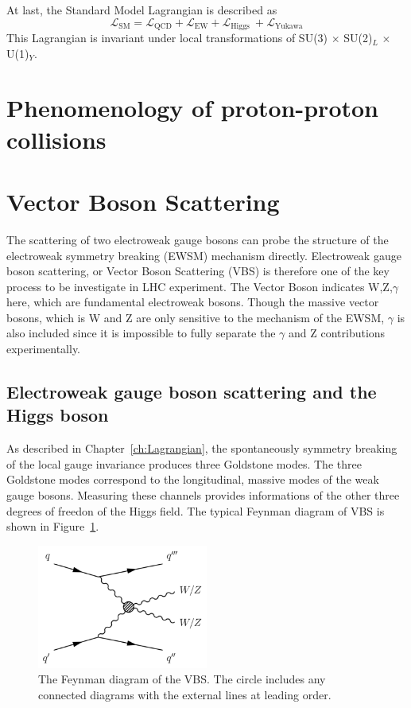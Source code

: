 At last, the Standard Model Lagrangian is described as 
\begin{equation}
\mathcal{L}_{\mathrm{SM}}=\mathcal{L}_{\mathrm{QCD}}+\mathcal{L}_{\mathrm{EW}}+\mathcal{L}_{\text {Higgs }}+\mathcal{L}_{\text {Yukawa}}
\end{equation}
This Lagrangian is invariant under local transformations of SU(3) $\times$ SU(2)$_L$ $\times$ U(1)$_Y$. 

\section{Phenomenology of proton-proton collisions}

\section{Vector Boson Scattering}
The scattering of two electroweak gauge bosons can probe the structure of the electroweak symmetry breaking (EWSM) mechanism directly. 
Electroweak gauge boson scattering, or Vector Boson Scattering (VBS) is therefore one of the key process to be investigate in LHC experiment.
The Vector Boson indicates W,Z,$\gamma$ here, which are fundamental electroweak bosons. Though the massive vector bosons, which is W and Z are only sensitive to the mechanism of the  EWSM, $\gamma$ is also included since it is impossible to fully separate the $\gamma$ and Z contributions experimentally. 
\subsection{Electroweak gauge boson scattering and the Higgs boson}
As described in Chapter~\ref{ch:Lagrangian}, the spontaneously symmetry breaking of the local gauge invariance produces three Goldstone modes. The three Goldstone modes correspond to the longitudinal, massive modes of the weak gauge bosons. Measuring these channels provides informations of the other three degrees of freedon of the Higgs field. The typical Feynman diagram of VBS is shown in Figure~\ref{fig:VBS}.

\begin{figure}[tbp]
\begin{center}
 \includegraphics[width=0.50\textwidth,keepaspectratio]{figures/VBS}
\caption{
The Feynman diagram of the VBS. The circle includes any connected diagrams with the external lines at leading order.%
}
\label{fig:VBS}
\end{center}
\end{figure}

